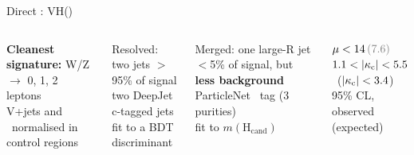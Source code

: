 \begin{frame}[t]{Direct \Hcc: VH(\Hcc)}
  \vspace*{-0.8em}
  \begin{columns}[T]
    \begin{keybox}
      \textbf{Cleanest signature:} W/Z $\to$ 0, 1, 2 leptons\\
      V+jets and \ttbar\ normalised in control regions\par\vspace{3pt}
      {\centering{}\enspace{}\enspace{}\par}
    \end{keybox}
    \vspace{2pt}
    {\centering{}\par}
    \par\vspace{9pt}
    \begin{minipage}[t]{0.49\linewidth}
      \begin{outbox}{Resolved: two jets}
        $>$95\% of signal\\
        two DeepJet c-tagged jets\\
        fit to a BDT discriminant
      \end{outbox}
    \end{minipage}\hfill
    \begin{minipage}[t]{0.49\linewidth}
      \begin{outbox}{Merged: one large-R jet}
        $<$5\% of signal, but \textbf{less background}\\
        ParticleNet \ccbar\ tag (3 purities)\\
        fit to $m(\mathrm{H_{cand}})$
      \end{outbox}
    \end{minipage}\par\vspace{6pt}
    \begin{resultbox}
      $\mu < \obsexp{14}{7.6}$\qquad $1.1 < |\kappa_\mathrm{c}| < 5.5$\ {\color{gray}($|\kappa_\mathrm{c}|<3.4$)}\\[-1pt]
      {\scriptsize\color{gray}95\% CL, observed (expected)}
    \end{resultbox}


\end{columns}
\end{frame}
